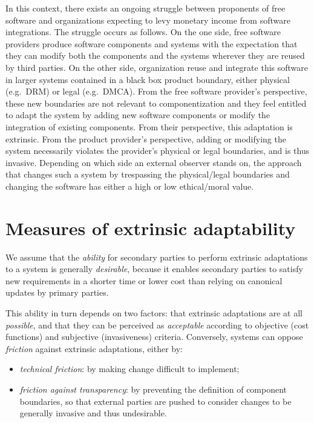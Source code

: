 \documentclass[a4paper]{article}
\newcommand{\eg}{e.g.~}
\begin{document}

In this context, there exists an ongoing struggle between proponents
of free software and organizations expecting to levy monetary income
from software integrations. The struggle occurs as follows. On the one
side, free software providers produce software components and systems
with the expectation that they can modify both the components and the
systems wherever they are reused by third parties.  On the other side,
organization reuse and integrate this software in larger systems
contained in a black box product boundary, either physical (\eg DRM) or legal
(\eg DMCA). From the free software provider's perspective, these new
boundaries are not relevant to componentization and they feel entitled
to adapt the system by adding new software components or modify the
integration of existing components. From their perspective, this adaptation is
extrinsic.  From the product provider's perspective, adding or
modifying the system necessarily violates the provider's physical or
legal boundaries, and is thus invasive. Depending on which side an
external observer stands on, the approach that changes such a system
by trespassing the physical/legal boundaries and changing the software
has either a high or low ethical/moral value.

\section{Measures of extrinsic adaptability}\label{sec:measure}

We assume that the \emph{ability} for secondary parties to perform
extrinsic adaptations to a system is generally \emph{desirable},
because it enables secondary parties to satisfy new requirements in a
shorter time or lower cost than relying on canonical updates by
primary parties.

This ability in turn depends on two factors: that extrinsic
adaptations are at all \emph{possible}, and that they can be perceived
as \emph{acceptable} according to objective (cost functions) and
subjective (invasiveness) criteria. Conversely, systems can oppose \emph{friction} against extrinsic
adaptations, either by:
\begin{itemize}
\item \emph{technical friction}: by making change difficult to implement;
\item \emph{friction against transparency}: by preventing the definition of
  component boundaries, so that external parties are pushed to
  consider changes to be generally invasive and thus undesirable.
\end{itemize}
\end{document}
